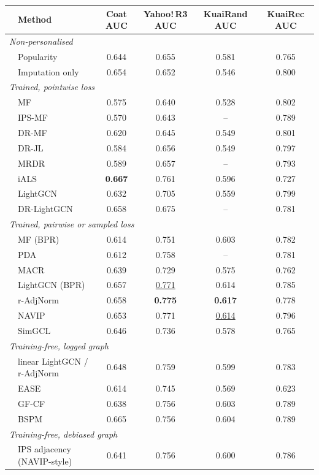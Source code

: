 \begin{tabular}{llcccc}
\toprule
 & Method & Coat AUC & Yahoo!\,R3 AUC & KuaiRand AUC & KuaiRec AUC\\
\midrule
\multicolumn{6}{l}{\emph{Non-personalised}}\\
 & Popularity & 0.644 & 0.655 & 0.581 & 0.765\\
 & Imputation only & 0.654 & 0.652 & 0.546 & 0.800\\
\multicolumn{6}{l}{\emph{Trained, pointwise loss}}\\
 & MF & 0.575 & 0.640 & 0.528 & 0.802\\
 & IPS-MF & 0.570 & 0.643 & -- & 0.789\\
 & DR-MF & 0.620 & 0.645 & 0.549 & 0.801\\
 & DR-JL & 0.584 & 0.656 & 0.549 & 0.797\\
 & MRDR & 0.589 & 0.657 & -- & 0.793\\
 & iALS & \textbf{0.667} & 0.761 & 0.596 & 0.727\\
 & LightGCN & 0.632 & 0.705 & 0.559 & 0.799\\
 & DR-LightGCN & 0.658 & 0.675 & -- & 0.781\\
\multicolumn{6}{l}{\emph{Trained, pairwise or sampled loss}}\\
 & MF (BPR) & 0.614 & 0.751 & 0.603 & 0.782\\
 & PDA & 0.612 & 0.758 & -- & 0.781\\
 & MACR & 0.639 & 0.729 & 0.575 & 0.762\\
 & LightGCN (BPR) & 0.657 & \underline{0.771} & 0.614 & 0.785\\
 & r-AdjNorm & 0.658 & \textbf{0.775} & \textbf{0.617} & 0.778\\
 & NAVIP & 0.653 & 0.771 & \underline{0.614} & 0.796\\
 & SimGCL & 0.646 & 0.736 & 0.578 & 0.765\\
\multicolumn{6}{l}{\emph{Training-free, logged graph}}\\
 & linear LightGCN / r-AdjNorm & 0.648 & 0.759 & 0.599 & 0.783\\
 & EASE & 0.614 & 0.745 & 0.569 & 0.623\\
 & GF-CF & 0.638 & 0.756 & 0.603 & 0.789\\
 & BSPM & 0.665 & 0.756 & 0.604 & 0.789\\
\multicolumn{6}{l}{\emph{Training-free, debiased graph}}\\
 & IPS adjacency (NAVIP-style) & 0.641 & 0.756 & 0.600 & 0.786\\

\end{tabular}
